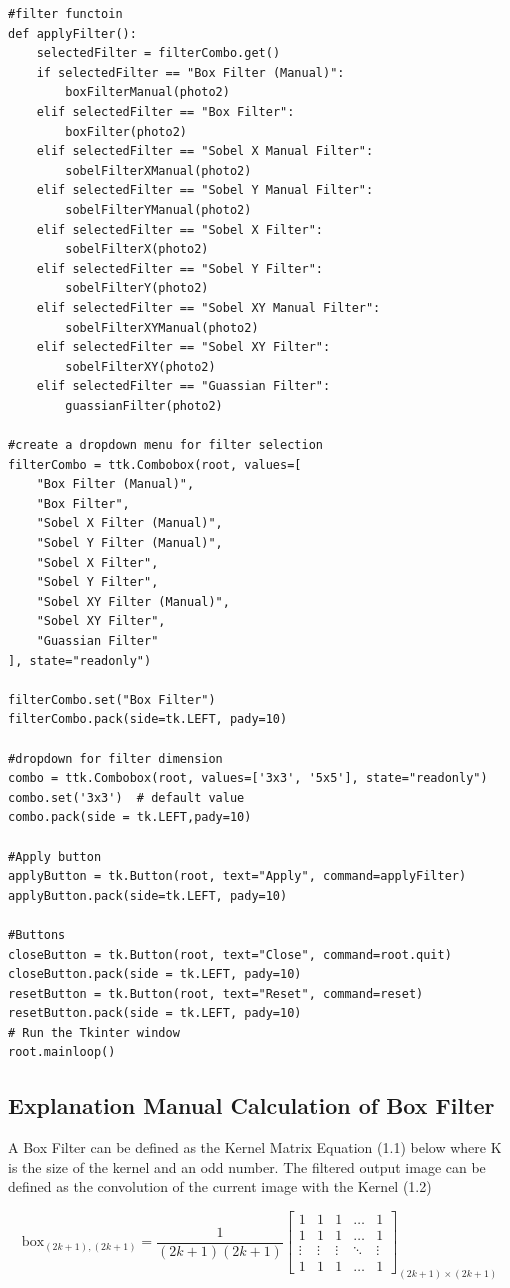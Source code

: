 \begin{verbatim}
#filter functoin
def applyFilter():
    selectedFilter = filterCombo.get()
    if selectedFilter == "Box Filter (Manual)":
        boxFilterManual(photo2)
    elif selectedFilter == "Box Filter":
        boxFilter(photo2)
    elif selectedFilter == "Sobel X Manual Filter":
        sobelFilterXManual(photo2)
    elif selectedFilter == "Sobel Y Manual Filter":
        sobelFilterYManual(photo2)
    elif selectedFilter == "Sobel X Filter":
        sobelFilterX(photo2)
    elif selectedFilter == "Sobel Y Filter":
        sobelFilterY(photo2)
    elif selectedFilter == "Sobel XY Manual Filter":
        sobelFilterXYManual(photo2)
    elif selectedFilter == "Sobel XY Filter":
        sobelFilterXY(photo2)
    elif selectedFilter == "Guassian Filter":
        guassianFilter(photo2)

#create a dropdown menu for filter selection
filterCombo = ttk.Combobox(root, values=[
    "Box Filter (Manual)",
    "Box Filter",
    "Sobel X Filter (Manual)",
    "Sobel Y Filter (Manual)",
    "Sobel X Filter",
    "Sobel Y Filter",
    "Sobel XY Filter (Manual)",
    "Sobel XY Filter",
    "Guassian Filter"
], state="readonly")

filterCombo.set("Box Filter")
filterCombo.pack(side=tk.LEFT, pady=10)

#dropdown for filter dimension
combo = ttk.Combobox(root, values=['3x3', '5x5'], state="readonly")
combo.set('3x3')  # default value
combo.pack(side = tk.LEFT,pady=10)

#Apply button
applyButton = tk.Button(root, text="Apply", command=applyFilter)
applyButton.pack(side=tk.LEFT, pady=10)

#Buttons
closeButton = tk.Button(root, text="Close", command=root.quit)
closeButton.pack(side = tk.LEFT, pady=10)
resetButton = tk.Button(root, text="Reset", command=reset)
resetButton.pack(side = tk.LEFT, pady=10)
# Run the Tkinter window
root.mainloop()
\end{verbatim}
\subsection{Explanation Manual Calculation of Box Filter}
A Box Filter can be defined as the Kernel Matrix Equation (1.1) below where K is the size of the kernel and an odd number. The filtered output image can be defined as the convolution of the current image with the Kernel (1.2)

\begin{equation}
    \text{box}_{(2k+1),(2k+1)} = \frac{1}{(2k+1)(2k+1)}
    \begin{bmatrix}
    1 & 1 & 1 & \dots & 1 \\
    1 & 1 & 1 & \dots & 1 \\
    \vdots & \vdots & \vdots & \ddots & \vdots \\
    1 & 1 & 1 & \dots & 1
    \end{bmatrix}_{(2k+1) \times (2k+1)}
    \label{eq:box_filter}
    \end{equation}
    
